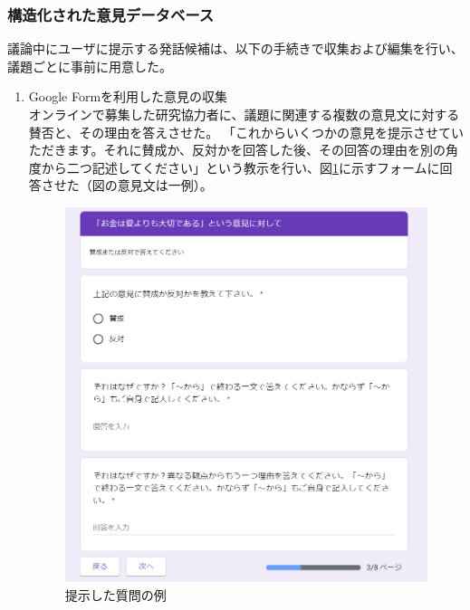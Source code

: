 \documentclass[11pt, a4paper]{jreport} %
\begin{document}
\subsubsection*{構造化された意見データベース}
議論中にユーザに提示する発話候補は、以下の手続きで収集および編集を行い、議題ごとに事前に用意した。
\begin{enumerate}
\item Google Formを利用した意見の収集\\
オンラインで募集した研究協力者に、議題に関連する複数の意見文に対する賛否と、その理由を答えさせた。
「これからいくつかの意見を提示させていただきます。それに賛成か、反対かを回答した後、その回答の理由を別の角度から二つ記述してください」という教示を行い、図\ref{fig:form1}に示すフォームに回答させた（図の意見文は一例）。

\begin{figure}[htbp]
\begin{center}
\includegraphics[width=120mm]{images/form1.png}
\caption{提示した質問の例}
\label{fig:form1}
\end{center}
\end{figure}



\end{enumerate}
\end{document}
